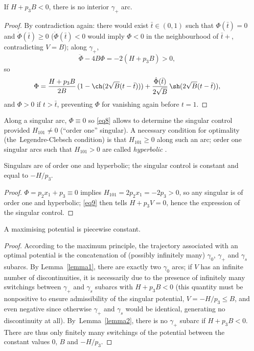 \begin{lemma} \label{lemma2}
If $H+p_3 B<0$, there is no interior $\gamma_+$ arc.
\end{lemma}
\begin{proof} By contradiction again: there would exist $\bar{t} \in (0,1)$
such that $\Phi(\bar{t})=0$ and $\dot{\Phi}(\bar{t}) \geq 0$ ($\dot{\Phi}(\bar{t})<0$
would imply $\Phi<0$ in the neighbourhood of $\bar{t}+$, contradicting $V=B$);
along $\gamma_+$,
\[
\ddot{\Phi}-4B\Phi =-2(H+p_3 B)>0,
\]
so
\begin{equation} \label{eq11}
\Phi = \frac{H+p_3 B}{2B}\,(1-\ch(2\sqrt{B}(t-\bar{t})))
+ \frac{\dot{\Phi}(\bar{t})}{2\sqrt{B}}\,\sh(2\sqrt{B}(t-\bar{t})),
\end{equation}
and $\Phi>0$ if $t > \bar{t}$, preventing $\Phi$ for vanishing again before
$t=1$.\end{proof}

Along a singular arc, $\Phi \equiv 0$ so \eqref{eq8} allows to determine the
singular control provided $H_{101} \neq 0$ (``order one'' singular).
A necessary condition for optimality
(the~Legendre-Clebsch condition) is that $H_{101} \geq 0$ along such an arc; order one
singular arcs such that $H_{101}>0$ are called \emph{hyperbolic} \cite{bonnard-2003a}.

\begin{lemma} Singulars are of order one and hyperbolic; the singular control is
constant and equal to $-H/p_3$.
\end{lemma}
\begin{proof} $\Phi=p_2x_1+p_3 \equiv 0$ implies $H_{101}=2p_2x_1=-2p_3>0$, so any
singular is of order one and hyperbolic; \eqref{eq9} then tells $H+p_3 V=0$, hence the
expression of the singular control.\end{proof}

\begin{prop} A maximising potential is piecewise constant.
\end{prop}
\begin{proof} According to the maximum principle, the trajectory associated with an
optimal potential is the concatenation of (possibly infinitely many) $\gamma_0$,
$\gamma_+$ and $\gamma_s$ subarcs. By Lemma~\ref{lemma1}, there are exactly two
$\gamma_0$ arcs; if $V$ has an infinite number of discontinuities, it is necessarily
due to the presence of infinitely many switchings between $\gamma_+$ and $\gamma_s$
subarcs with $H+p_3 B<0$ (this quantity must be nonpositive to ensure admissibility of
the singular potential, $V=-H/p_3 \leq B$, and even negative since otherwise
$\gamma_+$ and $\gamma_s$ would be identical, generating no discontinuity at all). By~Lemma~\ref{lemma2}, there is no $\gamma_+$ subarc if $H+p_3 B<0$. There are thus only
finitely many switchings of the potential between the constant values $0$, $B$ and
$-H/p_3$.
\end{proof}

